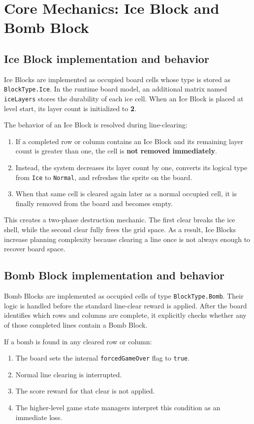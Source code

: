 \documentclass[a4paper,12pt]{report}
\begin{document}
\section{Core Mechanics: Ice Block and Bomb Block}
\subsection{Ice Block implementation and behavior}
Ice Blocks are implemented as occupied board cells whose type is stored as \texttt{BlockType.Ice}. In the runtime board model, an additional matrix named \texttt{iceLayers} stores the durability of each ice cell. When an Ice Block is placed at level start, its layer count is initialized to \textbf{2}.

The behavior of an Ice Block is resolved during line-clearing:
\begin{enumerate}
    \item If a completed row or column contains an Ice Block and its remaining layer count is greater than one, the cell is \textbf{not removed immediately}.
    \item Instead, the system decreases its layer count by one, converts its logical type from \texttt{Ice} to \texttt{Normal}, and refreshes the sprite on the board.
    \item When that same cell is cleared again later as a normal occupied cell, it is finally removed from the board and becomes empty.
\end{enumerate}

This creates a two-phase destruction mechanic. The first clear breaks the ice shell, while the second clear fully frees the grid space. As a result, Ice Blocks increase planning complexity because clearing a line once is not always enough to recover board space.

\subsection{Bomb Block implementation and behavior}
Bomb Blocks are implemented as occupied cells of type \texttt{BlockType.Bomb}. Their logic is handled before the standard line-clear reward is applied. After the board identifies which rows and columns are complete, it explicitly checks whether any of those completed lines contain a Bomb Block.

If a bomb is found in any cleared row or column:
\begin{enumerate}
    \item The board sets the internal \texttt{forcedGameOver} flag to \texttt{true}.
    \item Normal line clearing is interrupted.
    \item The score reward for that clear is not applied.
    \item The higher-level game state managers interpret this condition as an immediate loss.
\end{enumerate}
\end{document}
